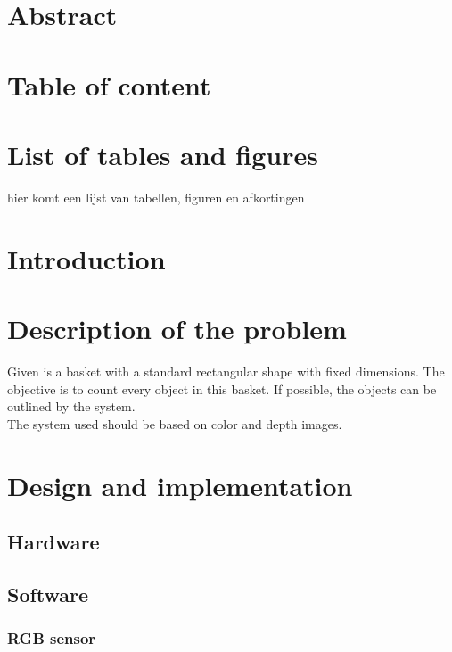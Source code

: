 \documentclass{article}
\begin{document}
\section{Abstract}

\section{Table of content}

\section{List of tables and figures}
hier komt een lijst van tabellen, figuren en afkortingen

\section{Introduction}

\section{Description of the problem}

\hspace{\parindent} Given is a basket with a standard rectangular shape with fixed dimensions. The objective is to count every object in this basket. If possible, the objects can be outlined by the system.\\

\noindent The system used should be based on color and depth images.


\section{Design and implementation}
\subsection{Hardware}
\subsection{Software}
\subsubsection{RGB sensor}
\end{document}
